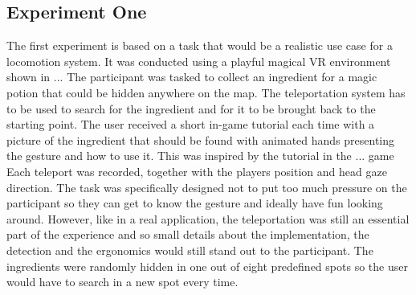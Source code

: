 


\subsection{Experiment One}
The first experiment is based on a task that would be a realistic use case for a locomotion system. It was conducted using a playful magical VR environment shown in ... %
The participant was tasked to collect an ingredient for a magic potion that could be hidden anywhere on the map. The teleportation system has to be used to search for the ingredient and for it to be brought back to the starting point. The user received a short in-game tutorial each time with a picture of the ingredient that should be found with animated hands presenting the gesture and how to use it. This was inspired by the tutorial in the ... game %
Each teleport was recorded, together with the players position and head gaze direction. The task was specifically designed not to put too much pressure on the participant so they can get to know the gesture and ideally have fun looking around. However, like in a real application, the teleportation was still an essential part of the experience and so small details about the implementation, the detection and the ergonomics would still stand out to the participant. The ingredients were randomly hidden in one out of eight predefined spots so the user would have to search in a new spot every time.

